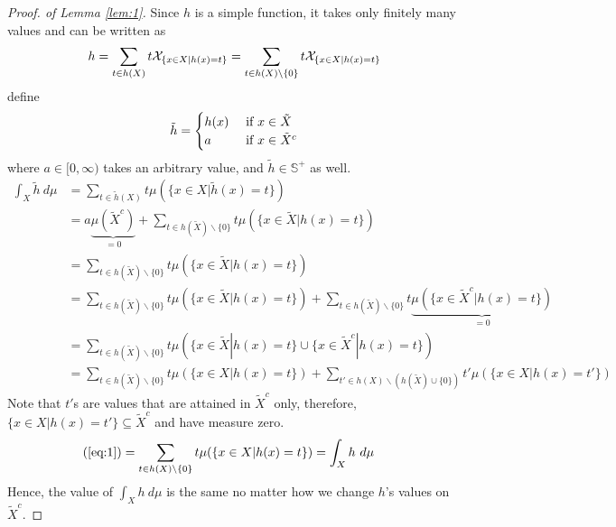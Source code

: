 \documentclass[11pt]{article}
\numberwithin{equation}{section}
\begin{document}
	\begin{proof}[Proof. of Lemma \ref{lem:1}]
		Since $h$ is a simple function, it takes only finitely many values and can be written as
		\begin{align}
			h = \sum_{t \in h(X)} t \mathcal{{X}}_{\{x \in X | h(x) = t\}} = \sum_{t \in h(X) \backslash \{0\}} t \mathcal{{X}}_{\{x \in X | h(x) = t\}}
		\end{align}
		define 
		\begin{align}
			\tilde{h} = \begin{cases}
				h(x) &\text{{ if }} x \in \tilde{X} \\
				a &\text{{ if }} x \in \tilde{X}^c
			\end{cases}
		\end{align}
		where $a \in [0, \infty)$ takes an arbitrary value, and $\tilde{h} \in \mathbb{S}^+$ as well.
		\begin{align}
			\int_X \tilde{h}\ d\mu &= \sum_{t \in \tilde{h}(X)} t \mu(\{x \in X | \tilde{h}(x) = t\})\\
			&= a \underbrace{\mu(\tilde{X}^c)}_{=0} + \sum_{t \in h(\tilde{X}) \backslash \{0\}} t \mu(\{x \in \tilde{X} | h(x) = t\}) \\
			&= \sum_{t \in h(\tilde{X}) \backslash \{0\}} t \mu(\{x \in \tilde{X} | h(x) = t\}) \\
			&= \sum_{t \in h(\tilde{X}) \backslash \{0\}} t \mu(\{x \in \tilde{X} | h(x) = t\}) +
			\sum_{t \in h(\tilde{X}) \backslash\{0\}} t \underbrace{\mu(\{x \in \tilde{X}^c | h(x) = t\})
			}_{=0} \\
			&= \sum_{t \in h(\tilde{X}) \backslash \{0\}} t \mu(\{x \in \tilde{X} | h(x) = t\} \cup \{x \in \tilde{X}^c | h(x) = t\}) \\
			&= \sum_{t \in h(\tilde{X}) \backslash \{0\}} t \mu(\{x \in X | h(x) = t\}) + \sum_{t' \in h(X) \backslash (h(\tilde{X}) \cup \{0\})} t' \mu(\{x \in X | h(x) = t'\}) \label{eq:1}
		\end{align}
		Note that $t'$s are values that are attained in $\tilde{X}^c$ only, therefore, $\{x \in X | h(x) = t'\} \subseteq \tilde{X}^c$ and have measure zero.
		\begin{align}
			(\ref{eq:1}) &= \sum_{t \in h(X) \backslash \{0\}} t \mu(\{x \in X | h(x) = t\}) = \int_X h\ d\mu
		\end{align}
		Hence, the value of $\int_X h\ d\mu$ is the same no matter how we change $h$'s values on $\tilde{X}^c$.
	\end{proof}
	
\end{document}
